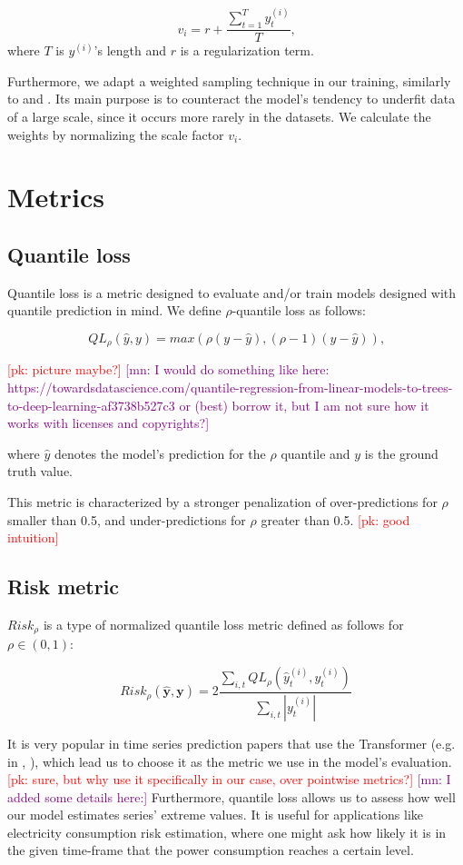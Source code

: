 \documentclass[en]{pracamgr}
\newcommand{\pk}[1]{\textcolor{red}{\small [pk: #1]}}
\newcommand{\mn}[1]{\textcolor{purple}{\small [mn: #1]}}
\begin{document}
$$ v_i = r + \frac{\sum^{T}_{t=1} y^{(i)}_t}{T} \text{,}$$
where $T$ is $y^{(i)}$'s length and $r$ is a regularization term.

Furthermore, we adapt a weighted sampling technique in our training, similarly to \cite{enhancing} and \cite{deepar}. Its main purpose is to counteract the model's tendency to underfit data of a large scale, since it occurs more rarely in the datasets. 
We calculate the weights by normalizing the scale factor $v_i$.

\section{Metrics}

\subsection{Quantile loss}

Quantile loss is a metric designed to evaluate and/or train models designed with quantile prediction in mind.
We define $\rho$-quantile loss as follows:

$$ QL_\rho(\hat{y}, y) = max(\rho(y - \hat{y}), (\rho - 1)(y - \hat{y})) \text{,} $$

\pk{picture maybe?} \mn{I would do something like here: https://towardsdatascience.com/quantile-regression-from-linear-models-to-trees-to-deep-learning-af3738b527c3 or (best) borrow it, but I am not sure how it works with licenses and copyrights?}

where $\hat{y}$ denotes the model's prediction for the $\rho$ quantile and $y$ is the ground truth value.

This metric is characterized by a stronger penalization of over-predictions for $\rho$ smaller than 0.5, and under-predictions for $\rho$ greater than 0.5. \pk{good intuition}

\subsection{Risk metric}

$Risk_\rho$ is a type of normalized quantile loss metric defined as follows for $\rho \in (0,1)$:

$$ Risk_\rho(\hat{\textbf{y}}, \textbf{y}) 
= 2\frac{\sum_{i,t}QL_\rho(\hat{y}^{(i)}_t, y^{(i)}_t)}
{\sum_{i,t} |y^{(i)}_t|}$$

It is very popular in time series prediction papers that use the Transformer (e.g. in \cite{enhancing}, \cite{deepar}), which lead us to choose it as the metric we use in the model's evaluation. \pk{sure, but why use it specifically in our case, over pointwise metrics?} \mn{I added some details here:} Furthermore, quantile loss allows us to assess how well our model estimates series' extreme values. It is useful for applications like electricity consumption risk estimation, where one might ask how likely it is in the given time-frame that the power consumption reaches a certain level. 
\end{document}
